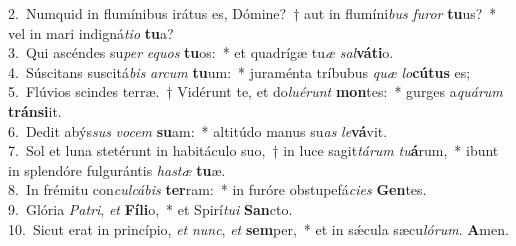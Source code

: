 {2.~}Numquid in flumínibus irátus es, Dómine?~† aut in flumíni\textit{bus} \textit{fu}\textit{ror} \textbf{tu}us?~* vel in mari indigná\textit{ti}\textit{o} \textbf{tu}a?\\
{3.~}Qui ascéndes su\textit{per} \textit{e}\textit{quos} \textbf{tu}os:~* et quadrígæ tu\textit{æ} \textit{sal}\textbf{vá}\textbf{ti}o.\\
{4.~}Súscitans suscitá\textit{bis} \textit{ar}\textit{cum} \textbf{tu}um:~* juraménta tríbubus \textit{quæ} \textit{lo}\textbf{cú}\textbf{tus} es;\\
{5.~}Flúvios scindes terræ.~† Vidérunt te, et do\textit{lu}\textit{é}\textit{runt} \textbf{mon}tes:~* gurges a\textit{quá}\textit{rum} \textbf{trán}\textbf{si}it.\\
{6.~}Dedit abýs\textit{sus} \textit{vo}\textit{cem} \textbf{su}am:~* altitúdo manus su\textit{as} \textit{le}\textbf{vá}vit.\\
{7.~}Sol et luna stetérunt in habitáculo suo,~† in luce sagit\textit{tá}\textit{rum} \textit{tu}\textbf{á}rum,~* ibunt in splendóre fulgurántis \textit{ha}\textit{stæ} \textbf{tu}æ.\\
{8.~}In frémitu con\textit{cul}\textit{cá}\textit{bis} \textbf{ter}ram:~* in furóre obstupefá\textit{ci}\textit{es} \textbf{Gen}tes.\\
{9.~}Glória \textit{Pa}\textit{tri}, \textit{et} \textbf{Fí}\textbf{li}o,~* et Spirí\textit{tu}\textit{i} \textbf{San}cto.\\
{10.~}Sicut erat in princípio, \textit{et} \textit{nunc}, \textit{et} \textbf{sem}per,~* et in sǽcula sæcu\textit{ló}\textit{rum}. \textbf{A}men.\\
